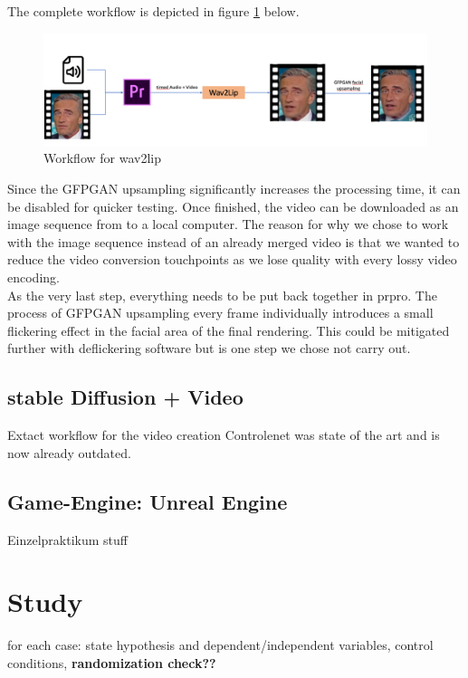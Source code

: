 \documentclass[
  a4paper,  %
  twoside,  %
  bibliography=totoc,
  headsepline,
  cleardoublepage=empty,
  parskip=half,
  draft=false
]{scrbook}
\begin{document}
The complete workflow is depicted in figure \ref{fig:w2l workflow} below.
\begin{figure}[h]
  \centering
  \includegraphics[width=1\textwidth]{./graphics/images/wav2lip/w2l workflow.png}
  \caption{Workflow for wav2lip}
  \label{fig:w2l workflow}
\end{figure}
Since the GFPGAN upsampling significantly increases the processing time, it can be disabled for quicker testing. Once finished, the video can be downloaded as an image sequence from to a local computer. The reason for why we chose to work with the image sequence instead of an already merged video is that we wanted to reduce the video conversion touchpoints as we lose quality with every lossy video encoding. \\
As the very last step, everything needs to be put back together in \gls{prpro}. The process of GFPGAN upsampling every frame individually introduces a small flickering effect in the facial area of the final rendering. This could be mitigated further with deflickering software but is one step we chose not carry out.





\subsection{stable Diffusion + Video}
\label{sec:sd-video}
Extact workflow for the video creation 
Controlenet was state of the art and is now already outdated. 

\subsection{Game-Engine: Unreal Engine}
Einzelpraktikum stuff

\section{Study}

for each case: state hypothesis and dependent/independent variables, control conditions, \textbf{randomization check??}
\end{document}
